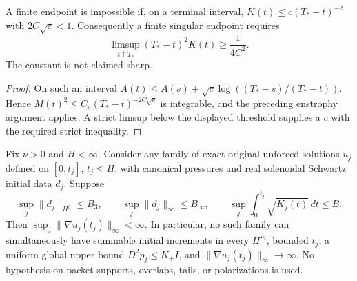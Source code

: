 \begin{corollary}
\label{pc:typeI}
A finite endpoint is impossible if, on a terminal interval,
$K(t)\le c(T_*-t)^{-2}$ with $2C\sqrt c<1$.
Consequently a finite singular endpoint requires
\[
 \limsup_{t\uparrow T_*}(T_*-t)^2 K(t)\ge\frac1{4C^2}.
\]
The constant is not claimed sharp.
\end{corollary}
\begin{proof}
On such an interval $A(t)\le A(s)+\sqrt c\log((T_*-s)/(T_*-t))$.
Hence $M(t)^2\le C_s(T_*-t)^{-2C\sqrt c}$ is integrable, and the
preceding enstrophy argument applies. A strict limsup below the displayed
threshold supplies a $c$ with the required strict inequality.
\end{proof}

\begin{proposition}
\label{pc:no-transfer}
Fix $\nu>0$ and $H<\infty$. Consider any family of exact original
unforced solutions $u_j$ defined on $[0,t_j]$, $t_j\le H$, with
canonical pressures and real solenoidal Schwartz initial data $d_j$.
Suppose
\[
 \sup_j\|d_j\|_{H^3}\le B_3,\qquad
 \sup_j\|d_j\|_\infty\le B_\infty,\qquad
 \sup_j\int_0^{t_j}\sqrt{K_j(t)}\,dt\le B.
\]
Then $\sup_j\|\nabla u_j(t_j)\|_\infty<\infty$. In particular,
no such family can simultaneously have summable initial increments in
every $H^m$, bounded $t_j$, a uniform global upper bound
$D^2p_j\le K_+I$, and $\|\nabla u_j(t_j)\|_\infty\to\infty$.
No hypothesis on packet supports, overlaps, tails, or polarizations is used.
\end{proposition}
